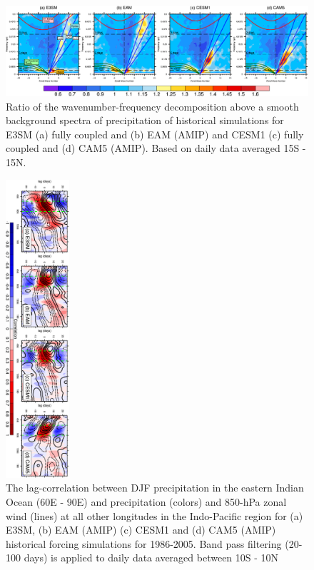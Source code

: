 \documentclass[draft,ms]{AGUTeX}
\begin{document}
\begin{article}
\begin{figure}[t]
  \begin{center}
   \noindent\includegraphics[width=1.0\textwidth,angle=0.]{./figs/f_eam_e3sm_kf.pdf}
  \end{center}
  \caption{Ratio of the wavenumber-frequency decomposition above a smooth background spectra of precipitation of historical simulations for E3SM (a) fully coupled and (b) EAM (AMIP) and CESM1 (c) fully coupled and (d) CAM5 (AMIP). Based on daily data averaged 15\deg S - 15\deg N.} 
\label{f_eam_e3sm_kf}
\end{figure}

\begin{figure}[t]
  \begin{center}
   \noindent\includegraphics[width=0.21\textwidth,angle=90.]{./figs/f_eam_e3sm_lagcorr.pdf}
  \end{center}
  \caption{The lag-correlation between DJF precipitation in the eastern Indian Ocean (60\deg E - 90\deg E) and precipitation (colors) and 850-hPa zonal wind (lines) at all other longitudes in the Indo-Pacific region for (a) E3SM, (b) EAM (AMIP) (c) CESM1 and (d) CAM5 (AMIP) historical forcing simulations for 1986-2005. Band pass filtering (20-100 days) is applied to daily data averaged between 10\deg S - 10\deg N} 
\label{f_e3sm_lagcorr}
\end{figure}


\end{article}
\end{document}
